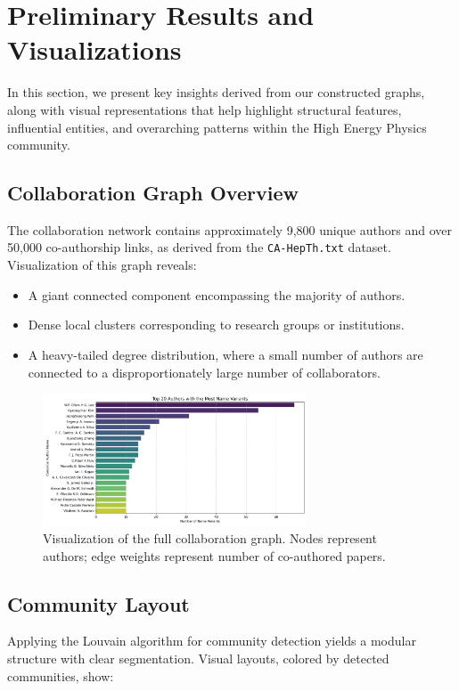 \documentclass[12pt]{article}
\begin{document}
\section{Preliminary Results and Visualizations}

In this section, we present key insights derived from our constructed graphs, along with visual representations that help highlight structural features, influential entities, and overarching patterns within the High Energy Physics community.

\subsection{Collaboration Graph Overview}
The collaboration network contains approximately 9,800 unique authors and over 50,000 co-authorship links, as derived from the \texttt{CA-HepTh.txt} dataset. Visualization of this graph reveals:

\begin{itemize}
    \item A giant connected component encompassing the majority of authors.
    \item Dense local clusters corresponding to research groups or institutions.
    \item A heavy-tailed degree distribution, where a small number of authors are connected to a disproportionately large number of collaborators.
\end{itemize}

\begin{figure}[H]
    \centering
    \includegraphics[width=0.7\textwidth]{pictures/top_author_name_variants.png}
    \caption{Visualization of the full collaboration graph. Nodes represent authors; edge weights represent number of co-authored papers.}
\end{figure}

\subsection{Community Layout}
Applying the Louvain algorithm for community detection yields a modular structure with clear segmentation. Visual layouts, colored by detected communities, show:
\end{document}
